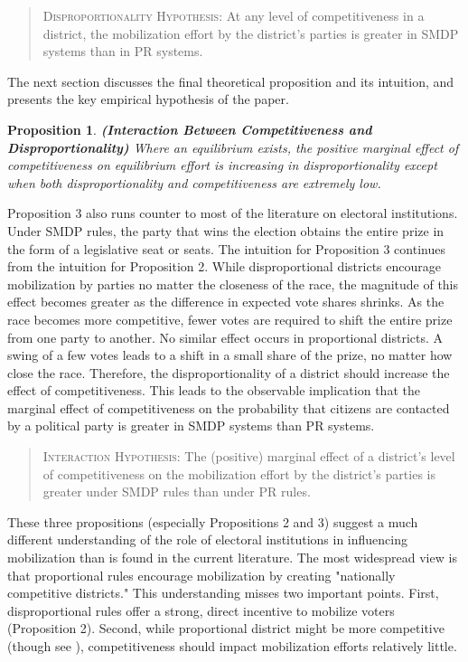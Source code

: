 \documentclass[12pt]{article}
\newtheorem{proposition}{Proposition}
\begin{document}
\begin{quote}
\textsc{Disproportionality Hypothesis}: At any level of competitiveness in a district, the mobilization effort by the district's parties is greater in SMDP systems than in PR systems.
\end{quote}

The next section discusses the final theoretical proposition and its intuition, and presents the key empirical hypothesis of the paper.

\begin{proposition}
\textbf{(Interaction Between Competitiveness and Disproportionality)} Where an equilibrium exists, the positive marginal effect of competitiveness on equilibrium effort is increasing in disproportionality except when both disproportionality and competitiveness are extremely low.

\end{proposition}

\noindent Proposition 3 also runs counter to most of the literature on electoral institutions. Under SMDP rules, the party that wins the election obtains the entire prize in the form of a legislative seat or seats. The intuition for Proposition 3 continues from the intuition for Proposition 2. While disproportional districts encourage mobilization by parties no matter the closeness of the race, the magnitude of this effect becomes greater as the difference in expected vote shares shrinks. As the race becomes more competitive, fewer votes are required to shift the entire prize from one party to another. No similar effect occurs in proportional districts. A swing of a few votes leads to a shift in a small share of the prize, no matter how close the race. Therefore, the disproportionality of a district should increase the effect of competitiveness. This leads to the observable implication that the marginal effect of competitiveness on the probability that citizens are contacted by a political party is greater in SMDP systems than PR systems.

\begin{quote}
\textsc{Interaction Hypothesis}: The (positive) marginal effect of a district's level of competitiveness on the mobilization effort by the district's parties is greater under SMDP rules than under PR rules.
\end{quote}

These three propositions (especially Propositions 2 and 3) suggest a much different understanding of the role of electoral institutions in influencing mobilization than is found in the current literature. The most widespread view is that proportional rules encourage mobilization by creating "nationally competitive districts." This understanding misses two important points. First, disproportional rules offer a strong, direct incentive to mobilize voters (Proposition 2). Second, while proportional district might be more competitive (though see \citealt{BlaisLago2009}), competitiveness should impact mobilization efforts relatively little. 
\end{document}
